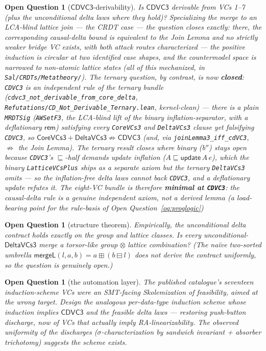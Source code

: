 \documentclass[11pt]{article}
\newtheorem{openq}[theorem]{Open Question}
\newcommand{\mergeL}{\mathsf{mergeL}}
\newcommand{\cd}{\mathsf{CDVC3}}
\newcommand{\lean}[1]{\texttt{#1}}
\begin{document}
\begin{openq}[$\cd$-derivability]
\label{oq:cd}
Is $\cd$ derivable from VCs 1--7 (plus the unconditional delta laws where
they hold)? Specializing the merge to an LCA-blind lattice join --- the
CRDT case --- the question closes exactly: there, the corresponding
causal-delta bound is \emph{equivalent} to the Join Lemma and no strictly
weaker bridge VC exists, with both attack routes
characterized --- the positive induction is circular at two identified case
shapes, and the countermodel space is narrowed to non-atomic lattice
states (all of this mechanized, in \lean{Sal/CRDTs/Metatheory/}). The
ternary question, by contrast, is now \textbf{closed}: \lean{CDVC3} is an
\emph{independent} rule of the ternary bundle
(\lean{cdvc3\_not\_derivable\_from\_core\_delta},
\lean{Refutations/CD\_Not\_Derivable\_Ternary.lean}, kernel-clean) --- there is
a plain \lean{MRDTSig} (\lean{AWSetF3}, the LCA-blind lift of the binary
inflation-separator, with a deflationary $\mathsf{rem}$) satisfying every
\lean{CoreVCs3} and \lean{DeltaVCs3} clause yet falsifying \lean{CDVC3}, so
$\mathsf{CoreVCs3} + \mathsf{DeltaVCs3} \not\Rightarrow \mathsf{CDVC3}$ (and,
via \lean{joinLemma3\_iff\_cdVC3}, $\not\Rightarrow$ the Join Lemma). The
ternary result closes where binary (b$''$) stays open because
\lean{CDVC3}'s $\sqsubseteq$-half demands update \emph{inflation}
($A \sqsubseteq \mathsf{update}\,A\,e$), which the binary \lean{LatticeVCsPlus}
ships as a separate axiom but the ternary \lean{DeltaVCs3} omits ---
so the inflation-free delta laws cannot back \lean{CDVC3}, and a deflationary
update refutes it. The eight-VC bundle is therefore \textbf{minimal at
\lean{CDVC3}}: the causal-delta rule is a genuine independent axiom, not a
derived lemma (a load-bearing point for the rule-basis of
Open Question~\ref{oq:proglogic})
\end{openq}

\begin{openq}[structure theorem]
\label{oq:structure}
Empirically, the \emph{unconditional} delta contract holds exactly on the
group and lattice classes. Is every unconditional-$\mathsf{DeltaVCs3}$
merge a torsor-like group$\,\otimes\,$lattice combination? (The na\"ive
two-sorted umbrella $\mergeL(l,a,b) = a \boxplus (b \boxminus l)$ does
\emph{not} derive the contract uniformly, so the question is genuinely
open.)
\end{openq}

\begin{openq}[the automation layer]
The published catalogue's seventeen induction-scheme VCs were an
SMT-facing Skolemization of feasibility, aimed at the wrong target.
Design the analogous per-data-type induction scheme whose induction
implies $\cd$ and the feasible delta laws --- restoring push-button
discharge, now of VCs that actually imply RA-linearizability. The
observed uniformity of the discharges ($\sigma$-characterization by
sandwich invariant + absorber trichotomy) suggests the scheme exists.
\end{openq}
\end{document}
